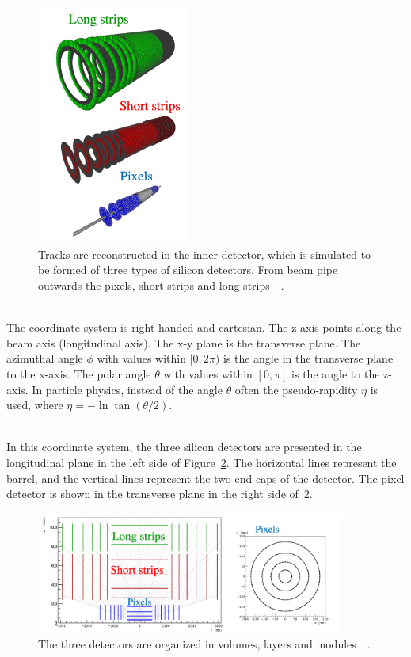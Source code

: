 \begin{figure}[htb]
\centering
\includegraphics[width=0.45\textwidth]{./plots/ThreeSiDetectors.png}
\caption{Tracks are reconstructed in the inner detector, which is simulated to be formed of three types of silicon detectors. From beam pipe outwards the pixels, short strips and long strips~\cite{TrackMLPPTBefore}~\cite{TrackMLPaperAccuracyPhase}.}
\label{fig:ThreeSiDetectors}
\end{figure}

\ \\The coordinate system is right-handed and cartesian. The z-axis points along the beam axis (longitudinal axis). The x-y plane is the transverse plane. The azimuthal angle $\phi$ with values within $[0, 2\pi)$ is the angle in the transverse plane to the x-axis. The polar angle $\theta$ with values within $[0, \pi]$ is the angle to the z-axis. In particle physics, instead of the angle $\theta$ often the pseudo-rapidity $\eta$ is used, where $\eta = -\ln \tan (\theta/2)$.

\ \\In this coordinate system, the three silicon detectors are presented in the longitudinal plane in the left side of Figure~\ref{fig:DetectorGeometry}. The horizontal lines represent the barrel, and the vertical lines represent the two end-caps of the detector. The pixel detector is shown in the transverse plane in the right side of~\ref{fig:DetectorGeometry}. 

\begin{figure}[hbt]
\centering
\includegraphics[width=0.9\textwidth]{./plots/DetectorGeometry.png}
\caption{The three detectors are organized in volumes, layers and modules~\cite{TrackMLPPTBefore}~\cite{TrackMLPaperAccuracyPhase}.}
\label{fig:DetectorGeometry}
\end{figure}

